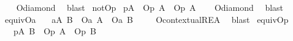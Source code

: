 \begin{isabellebody}
%
\isadelimproof
\ \ %
\endisadelimproof
%
\isatagproof
{}\isamarkupfalse%
\ O{\isacharunderscore}diamond\ \isamarkupfalse%
\ blast%
\endisatagproof
{\isafoldproof}%
%
\isadelimproof
\isanewline
%
\endisadelimproof
{}\isamarkupfalse%
\ not{\isacharunderscore}Op{\isacharcolon}\isanewline
{}\ {\isachardoublequoteopen}{\isasymTurnstile}{\isacharparenleft}{\isacharparenleft}{\isasymbox}\isactrlsub pA{\isacharparenright}\ \isactrlbold {\isasymrightarrow}\ {\isacharparenleft}{\isacharparenleft}\isactrlbold {\isasymnot}{\isacharparenleft}O\isactrlsub p\ A{\isacharparenright}{\isacharparenright}\ \isactrlbold {\isasymand}\ {\isacharparenleft}\isactrlbold {\isasymnot}{\isacharparenleft}O\isactrlsub p\ {\isacharparenleft}\isactrlbold {\isasymnot}A{\isacharparenright}{\isacharparenright}{\isacharparenright}{\isacharparenright}{\isacharparenright}{\isachardoublequoteclose}\isanewline
%
\isadelimproof
\ \ %
\endisadelimproof
%
\isatagproof
{}\isamarkupfalse%
\ O{\isacharunderscore}diamond\ \isamarkupfalse%
\ blast%
\endisatagproof
{\isafoldproof}%
%
\isadelimproof
\isanewline
%
\endisadelimproof
{}\isamarkupfalse%
\ equiv{\isacharunderscore}Oa{\isacharcolon}\isanewline
\ \ \ {\isachardoublequoteopen}{\isasymTurnstile}{\isacharparenleft}{\isacharparenleft}{\isasymbox}\isactrlsub a{\isacharparenleft}A\ \isactrlbold {\isasymequiv}B{\isacharparenright}{\isacharparenright}\ \isactrlbold {\isasymrightarrow}\ {\isacharparenleft}{\isacharparenleft}O\isactrlsub a\ A{\isacharparenright}\ \isactrlbold {\isasymequiv}\ {\isacharparenleft}O\isactrlsub a\ B{\isacharparenright}\ {\isacharparenright}{\isacharparenright}{\isachardoublequoteclose}\isanewline
%
\isadelimproof
\ \ %
\endisadelimproof
%
\isatagproof
{}\isamarkupfalse%
\ O{\isacharunderscore}contextual{\isacharunderscore}REA\ \isamarkupfalse%
\ blast%
\endisatagproof
{\isafoldproof}%
%
\isadelimproof
\isanewline
%
\endisadelimproof
{}\isamarkupfalse%
\ equiv{\isacharunderscore}Op{\isacharcolon}\isanewline
\ \ \ {\isachardoublequoteopen}{\isasymTurnstile}{\isacharparenleft}{\isacharparenleft}{\isasymbox}\isactrlsub p{\isacharparenleft}A\ \isactrlbold {\isasymequiv}B{\isacharparenright}{\isacharparenright}\ \isactrlbold {\isasymrightarrow}\ {\isacharparenleft}{\isacharparenleft}O\isactrlsub p\ A{\isacharparenright}\ \isactrlbold {\isasymequiv}\ {\isacharparenleft}O\isactrlsub p\ B{\isacharparenright}\ {\isacharparenright}{\isacharparenright}{\isachardoublequoteclose}\isanewline

\end{isabellebody}
